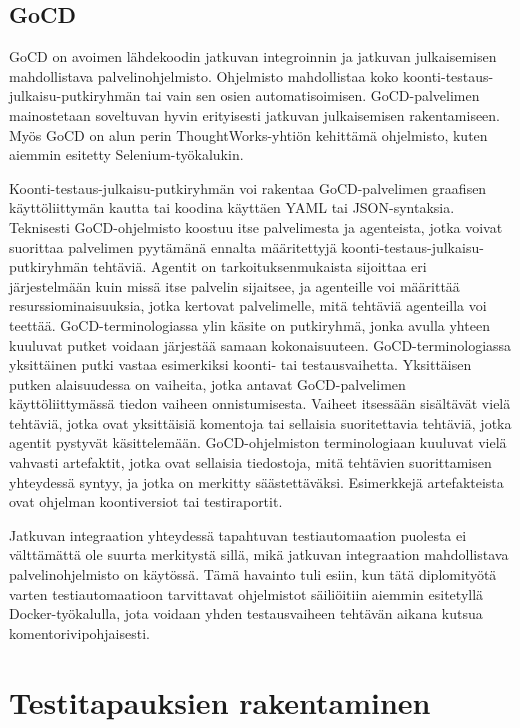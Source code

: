   \subsection{GoCD} \label{ch:08_gocd}

    GoCD on avoimen lähdekoodin jatkuvan integroinnin ja jatkuvan julkaisemisen mahdollistava palvelinohjelmisto.
    Ohjelmisto mahdollistaa koko koonti-testaus-julkaisu-putkiryhmän tai vain sen osien automatisoimisen.
    GoCD-palvelimen mainostetaan soveltuvan hyvin erityisesti jatkuvan julkaisemisen rakentamiseen.
    Myös GoCD on alun perin ThoughtWorks-yhtiön kehittämä ohjelmisto, kuten aiemmin esitetty Selenium-työkalukin. \cite{gocd_basic_info}

    Koonti-testaus-julkaisu-putkiryhmän voi rakentaa GoCD-palvelimen graafisen käyttöliittymän kautta tai koodina käyttäen YAML tai JSON-syntaksia.
    Teknisesti GoCD-ohjelmisto koostuu itse palvelimesta ja agenteista, jotka voivat suorittaa palvelimen pyytämänä ennalta määritettyjä koonti-testaus-julkaisu-putkiryhmän tehtäviä.
    Agentit on tarkoituksenmukaista sijoittaa eri järjestelmään kuin missä itse palvelin sijaitsee, ja agenteille voi määrittää resurssiominaisuuksia, jotka kertovat palvelimelle, mitä tehtäviä agenteilla voi teettää.
    GoCD-terminologiassa ylin käsite on putkiryhmä, jonka avulla yhteen kuuluvat putket voidaan järjestää samaan kokonaisuuteen.
    GoCD-terminologiassa yksittäinen putki vastaa esimerkiksi koonti- tai testausvaihetta.
    Yksittäisen putken alaisuudessa on vaiheita, jotka antavat GoCD-palvelimen käyttöliittymässä tiedon vaiheen onnistumisesta.
    Vaiheet itsessään sisältävät vielä tehtäviä, jotka ovat yksittäisiä komentoja tai sellaisia suoritettavia tehtäviä, jotka agentit pystyvät käsittelemään.
    GoCD-ohjelmiston terminologiaan kuuluvat vielä vahvasti artefaktit, jotka ovat sellaisia tiedostoja, mitä tehtävien suorittamisen yhteydessä syntyy, ja jotka on merkitty säästettäväksi.
    Esimerkkejä artefakteista ovat ohjelman koontiversiot tai testiraportit. \cite{gocd_key_concepts}

    Jatkuvan integraation yhteydessä tapahtuvan testiautomaation puolesta ei välttämättä ole suurta merkitystä sillä, mikä jatkuvan integraation mahdollistava palvelinohjelmisto on käytössä.
    Tämä havainto tuli esiin, kun tätä diplomityötä varten testiautomaatioon tarvittavat ohjelmistot säiliöitiin aiemmin esitetyllä Docker-työkalulla, jota voidaan yhden testausvaiheen tehtävän aikana kutsua komentorivipohjaisesti.

\section{Testitapauksien rakentaminen} \label{ch:08_testitapauksien_rakentaminen}

